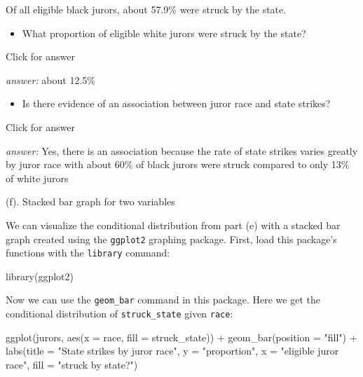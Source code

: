 \documentclass[
]{book}
\newenvironment{Shaded}{\begin{snugshade}}{\end{snugshade}}
\newcommand{\AttributeTok}[1]{\textcolor[rgb]{0.77,0.63,0.00}{#1}}
\newcommand{\FunctionTok}[1]{\textcolor[rgb]{0.00,0.00,0.00}{#1}}
\newcommand{\NormalTok}[1]{#1}
\newcommand{\SpecialCharTok}[1]{\textcolor[rgb]{0.00,0.00,0.00}{#1}}
\newcommand{\StringTok}[1]{\textcolor[rgb]{0.31,0.60,0.02}{#1}}
\providecommand{\tightlist}{%
  \setlength{\itemsep}{0pt}\setlength{\parskip}{0pt}}
\begin{document}
Of all eligible black jurors, about 57.9\% were struck by the state.

\begin{itemize}
\tightlist
\item
  What proportion of eligible white jurors were struck by the state?
\end{itemize}

Click for answer

\emph{answer:} about 12.5\%

\begin{itemize}
\tightlist
\item
  Is there evidence of an association between juror race and state strikes?
\end{itemize}

Click for answer

\emph{answer:} Yes, there is an association because the rate of state strikes varies greatly by juror race with
about 60\% of black jurors were struck compared to only 13\% of white jurors

(f). Stacked bar graph for two variables

We can visualize the conditional distribution from part (e) with a stacked bar graph created using the \texttt{ggplot2} graphing package. First, load this package's functions with the \texttt{library} command:

\begin{Shaded}
\begin{Highlighting}[]
\FunctionTok{library}\NormalTok{(ggplot2)}
\end{Highlighting}
\end{Shaded}

Now we can use the \texttt{geom\_bar} command in this package. Here we get the conditional distribution of \texttt{struck\_state} given \texttt{race}:

\begin{Shaded}
\begin{Highlighting}[]
\FunctionTok{ggplot}\NormalTok{(jurors, }\FunctionTok{aes}\NormalTok{(}\AttributeTok{x =}\NormalTok{ race, }\AttributeTok{fill =}\NormalTok{ struck\_state)) }\SpecialCharTok{+} 
  \FunctionTok{geom\_bar}\NormalTok{(}\AttributeTok{position =} \StringTok{"fill"}\NormalTok{) }\SpecialCharTok{+} 
  \FunctionTok{labs}\NormalTok{(}\AttributeTok{title =} \StringTok{"State strikes by juror race"}\NormalTok{, }\AttributeTok{y =} \StringTok{"proportion"}\NormalTok{, }
       \AttributeTok{x =} \StringTok{"eligible juror race"}\NormalTok{, }\AttributeTok{fill =} \StringTok{"struck by state?"}\NormalTok{)}
\end{Highlighting}
\end{Shaded}
\end{document}
